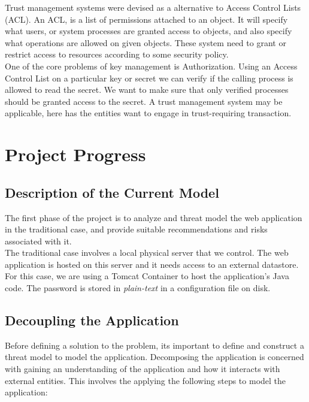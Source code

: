 \documentclass[11pt, a4paper, twoside, notitlepage]{article}
\begin{document}
Trust management systems were devised as a alternative to Access Control Lists (ACL). An ACL, is a list of permissions attached to an object. It will specify what users, or system processes are granted access to objects, and also specify what operations are allowed on given objects. \cite{acl-rfc} These system need to grant or restrict access to resources according to some security policy. \\

One of the core problems of key management is Authorization. Using an Access Control List on a particular key or secret we can verify if the calling process is allowed to read the secret. We want to make sure that only verified processes should be granted access to the secret. A trust management system may be applicable, here has the entities want to engage in trust-requiring transaction.\cite{herzberg2000access} \\


\section{Project Progress}
\subsection*{Description of the Current Model}
The first phase of the project is to analyze and threat model the web application in the traditional case, and provide suitable recommendations and risks associated with it. \\

The traditional case involves a local physical server that we control. The web application is hosted on this server and it needs access to an external datastore. For this case, we are using a Tomcat Container to host the application's Java code. The password is stored in \emph{plain-text} in a configuration file on disk. \\

\subsection*{Decoupling the Application}
Before defining a solution to the problem, its important to define and construct a threat model to model the application. Decomposing the application is concerned with gaining an understanding of the application and how it interacts with external entities. This involves the applying the following steps to model the application:  
\end{document}
